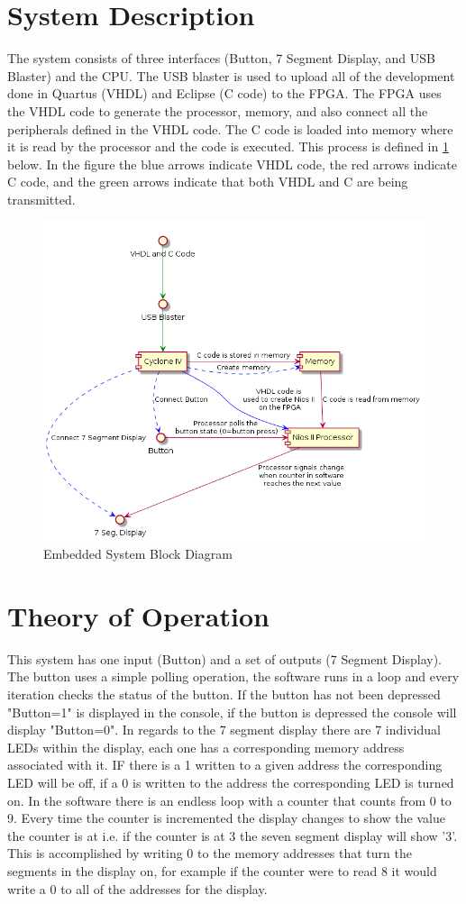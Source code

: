 \documentclass[10pt,a4paper]{article}
\begin{document}
	\section{System Description}
	The system consists of three interfaces (Button, 7 Segment Display, and USB Blaster) and the CPU. The USB blaster is used to upload all of the development done in Quartus (VHDL) and Eclipse (C code) to the FPGA. The FPGA uses the VHDL code to generate the processor, memory, and also connect all the peripherals defined in the VHDL code. The C code is loaded into memory where it is read by the processor and the code is executed. This process is defined in \ref{block} below. In the figure the blue arrows indicate VHDL code, the red arrows indicate C code, and the green arrows indicate that both VHDL and C are being transmitted.  
	\begin{figure}[H]
		\centering\includegraphics[width=15cm]{HW1_Block.png}
		\caption{Embedded System Block Diagram}
		\label{block}
	\end{figure}
	\section{Theory of Operation}
	This system has one input (Button) and a set of outputs (7 Segment Display). The button uses a simple polling operation, the software runs in a loop and every iteration checks the status of the button. If the button has not been depressed "Button=1" is displayed in the console, if the button is depressed the console will display "Button=0". In regards to the 7 segment display there are 7 individual LEDs within the display, each one has a corresponding memory address associated with it. IF there is a 1 written to a given address the corresponding LED will be off, if a 0 is written to the address the corresponding LED is turned on. In the software there is an endless loop with a counter that counts from 0 to 9. Every time the counter is incremented the display changes to show the value the counter is at i.e. if the counter is at 3 the seven segment display will show '3'. This is accomplished by writing 0 to the memory addresses that turn the segments in the display on, for example if the counter were to read 8 it would write a 0 to all of the addresses for the display. 
\end{document}
